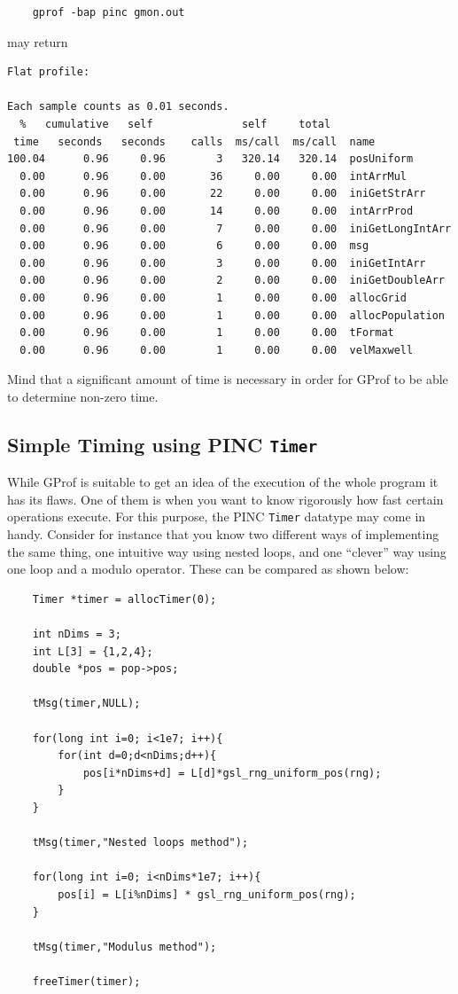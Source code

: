 \documentclass[10pt,a4paper]{article}
\begin{document}
\begin{verbatim}
	gprof -bap pinc gmon.out
\end{verbatim}
may return

\begin{verbatim}
Flat profile:

Each sample counts as 0.01 seconds.
  %   cumulative   self              self     total           
 time   seconds   seconds    calls  ms/call  ms/call  name    
100.04      0.96     0.96        3   320.14   320.14  posUniform
  0.00      0.96     0.00       36     0.00     0.00  intArrMul
  0.00      0.96     0.00       22     0.00     0.00  iniGetStrArr
  0.00      0.96     0.00       14     0.00     0.00  intArrProd
  0.00      0.96     0.00        7     0.00     0.00  iniGetLongIntArr
  0.00      0.96     0.00        6     0.00     0.00  msg
  0.00      0.96     0.00        3     0.00     0.00  iniGetIntArr
  0.00      0.96     0.00        2     0.00     0.00  iniGetDoubleArr
  0.00      0.96     0.00        1     0.00     0.00  allocGrid
  0.00      0.96     0.00        1     0.00     0.00  allocPopulation
  0.00      0.96     0.00        1     0.00     0.00  tFormat
  0.00      0.96     0.00        1     0.00     0.00  velMaxwell
\end{verbatim}

Mind that a significant amount of time is necessary in order for GProf to be able to determine non-zero time.

\subsection{Simple Timing using PINC \texttt{Timer}}
While GProf is suitable to get an idea of the execution of the whole program it has its flaws. One of them is when you want to know rigorously how fast certain operations execute. For this purpose, the PINC \texttt{Timer} datatype may come in handy. Consider for instance that you know two different ways of implementing the same thing, one intuitive way using nested loops, and one ``clever'' way using one loop and a modulo operator. These can be compared as shown below:

\begin{lstlisting}
	Timer *timer = allocTimer(0);

	int nDims = 3;
	int L[3] = {1,2,4};
	double *pos = pop->pos;

	tMsg(timer,NULL);
	
	for(long int i=0; i<1e7; i++){
		for(int d=0;d<nDims;d++){
			pos[i*nDims+d] = L[d]*gsl_rng_uniform_pos(rng);
		}
	}
	
	tMsg(timer,"Nested loops method");

	for(long int i=0; i<nDims*1e7; i++){
		pos[i] = L[i%nDims] * gsl_rng_uniform_pos(rng);
	}
	
	tMsg(timer,"Modulus method");

	freeTimer(timer);
\end{lstlisting}
\end{document}
